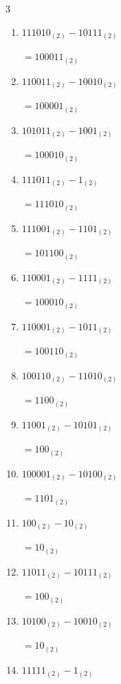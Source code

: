 \begin{multicols}{3}
\begin{enumerate}
        $=10100_{(2)}$

  \item $111010_{(2)} - 10111_{(2)}$

        $=100011_{(2)}$

  \item $110011_{(2)} - 10010_{(2)}$

        $=100001_{(2)}$

\columnbreak %

\resetques

  \item $101011_{(2)} - 1001_{(2)}$

        $=100010_{(2)}$

  \item $111011_{(2)} - 1_{(2)}$

        $=111010_{(2)}$

  \item $111001_{(2)} - 1101_{(2)}$

        $=101100_{(2)}$

  \item $110001_{(2)} - 1111_{(2)}$

        $=100010_{(2)}$

  \item $110001_{(2)} - 1011_{(2)}$

        $=100110_{(2)}$

  \item $100110_{(2)} - 11010_{(2)}$

        $=1100_{(2)}$

  \item $11001_{(2)} - 10101_{(2)}$

        $=100_{(2)}$

  \item $100001_{(2)} - 10100_{(2)}$

        $=1101_{(2)}$

  \item $100_{(2)} - 10_{(2)}$

        $=10_{(2)}$

  \item $11011_{(2)} - 10111_{(2)}$

        $=100_{(2)}$

\columnbreak %

  \item $10100_{(2)} - 10010_{(2)}$

        $=10_{(2)}$

  \item $11111_{(2)} - 1_{(2)}$


\end{enumerate}
\end{multicols}
